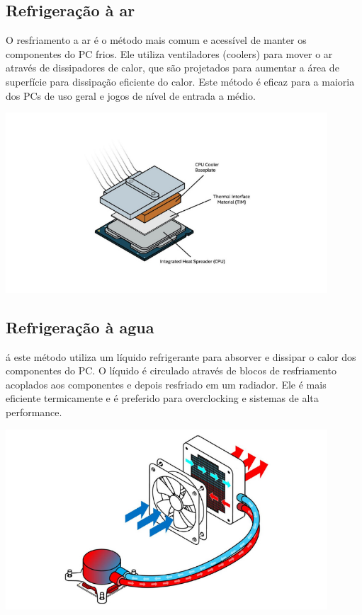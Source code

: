 \documentclass{article}
\begin{document}
\subsection{Refrigeração à ar}
O resfriamento a ar é o método mais comum e acessível de manter os componentes do PC frios. Ele utiliza ventiladores (coolers) para mover o ar através de dissipadores de calor, que são projetados para aumentar a área de superfície para dissipação eficiente do calor. Este método é eficaz para a maioria dos PCs de uso geral e jogos de nível de entrada a médio.
\begin{adjustbox}{center,caption={Funcionamento básico de refrigeração a ar (Imagem: Intel/Divulgação)},nofloat=figure,vspace=\bigskipamount}
    \includegraphics[width=12cm]{fusca.png}
\end{adjustbox}
\subsection{Refrigeração à agua}
á este método utiliza um líquido refrigerante para absorver e dissipar o calor dos componentes do PC. O líquido é circulado através de blocos de resfriamento acoplados aos componentes e depois resfriado em um radiador. Ele é mais eficiente termicamente e é preferido para overclocking e sistemas de alta performance.
\begin{adjustbox}{center,caption={Exemplo de refrigeração liquida (Imagem: Intel/Divulgação)},nofloat=figure,vspace=\bigskipamount}
    \includegraphics[width=12cm]{ap.png}
\end{adjustbox}
\end{document}
